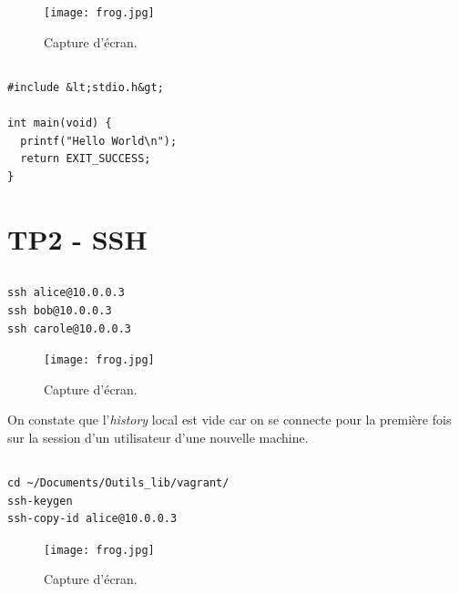 \documentclass{article}
\begin{document}
\subsection{}

\begin{figure}[h]
\centering
\texttt{[image: frog.jpg]}
\caption{\label{fig:frog}Capture d'écran.}
\end{figure}

\subsection{}
\begin{lstlisting}
#include &lt;stdio.h&gt;

int main(void) {
  printf("Hello World\n");
  return EXIT_SUCCESS;
}
\end{lstlisting}


\section{TP2 - SSH}

\subsection{}

\begin{lstlisting}
ssh alice@10.0.0.3
ssh bob@10.0.0.3
ssh carole@10.0.0.3
\end{lstlisting}

\begin{figure}[h]
\centering
\texttt{[image: frog.jpg]}
\caption{\label{fig:frog}Capture d'écran.}
\end{figure}

On constate que l'\emph{history} local est vide car on se connecte pour la première fois sur la session d'un utilisateur d'une nouvelle machine.

\subsection{}

\begin{lstlisting}
cd ~/Documents/Outils_lib/vagrant/
ssh-keygen
ssh-copy-id alice@10.0.0.3
\end{lstlisting}

\begin{figure}[h]
\centering
\texttt{[image: frog.jpg]}
\caption{\label{fig:frog}Capture d'écran.}
\end{figure}
\end{document}
